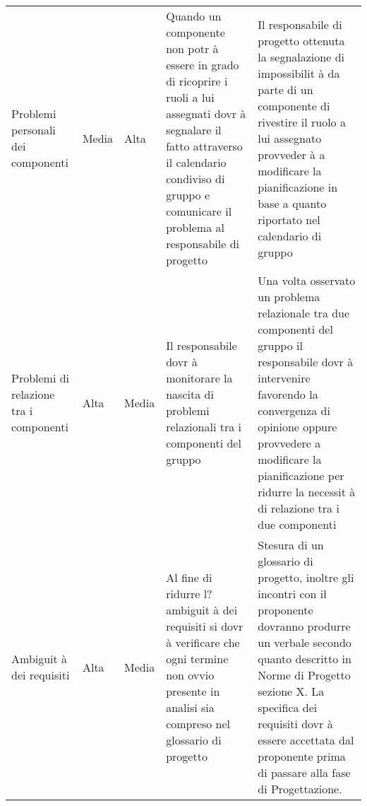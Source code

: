 \begin{table}[h]
\begin{tabular}{lllll}
Problemi personali dei componenti & Media & Alta & Quando un componente non potr \`{a} essere in grado di ricoprire i ruoli a lui assegnati dovr \`{a} segnalare il fatto attraverso il calendario condiviso di gruppo e comunicare il problema al responsabile di progetto & Il responsabile di progetto ottenuta la segnalazione di impossibilit \`{a} da parte di un componente di rivestire il ruolo a lui assegnato provveder \`{a} a modificare la pianificazione in base a quanto riportato nel calendario di gruppo \\
Problemi di relazione tra i componenti & Alta & Media & Il responsabile dovr \`{a} monitorare la nascita di problemi relazionali tra i componenti del gruppo & Una volta osservato un problema relazionale tra due componenti del gruppo il responsabile dovr \`{a} intervenire favorendo la convergenza di opinione oppure provvedere a modificare la pianificazione per ridurre la necessit \`{a} di relazione tra i due componenti \\
Ambiguit \`{a} dei requisiti & Alta & Media & Al fine di ridurre l?ambiguit \`{a} dei requisiti si dovr \`{a} verificare che ogni termine non ovvio presente in analisi sia compreso nel glossario di progetto & Stesura di un glossario di progetto, inoltre gli incontri con il proponente dovranno produrre un verbale secondo quanto descritto in Norme di Progetto sezione X. La specifica dei requisiti dovr \`{a} essere accettata dal proponente prima di passare alla fase di Progettazione. 
\end{tabular}
\end{table}

